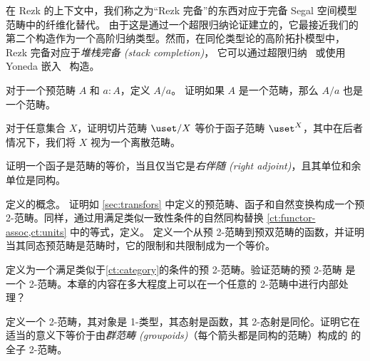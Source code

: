 在 Rezk 的上下文中，我们称之为“Rezk 完备”的东西对应于完备 Segal 空间模型范畴中的纤维化替代。
由于这是通过一个超限归纳论证建立的，它最接近我们的第二个构造作为一个高阶归纳类型。然而，在同伦类型论的高阶拓扑模型中，Rezk 完备对应于\emph{堆栈完备 (stack completion)}， 它可以通过超限归纳~\cite{jt:strong-stacks} 或使用 Yoneda 嵌入~\cite{bunge:stacks-morita-internal} 构造。


\sectionExercises

\begin{ex}\label{ex:slice-precategory}
对于一个预范畴 $A$ 和 $a:A$，定义 $A/a$。
%
%
证明如果 $A$ 是一个范畴，那么 $A/a$ 也是一个范畴。
%
\end{ex}

\begin{ex}\label{ex:set-slice-over-equiv-functor-category}
对于任意集合 $X$，证明切片范畴 $\uset/X$ 等价于函子范畴 $\uset^X$，其中在后者情况下，我们将 $X$ 视为一个离散范畴。
\end{ex}

\begin{ex}\label{ex:functor-equiv-right-adjoint}
%
%
证明一个函子是范畴的等价，当且仅当它是\emph{右伴随 (right adjoint)}，且其单位和余单位是同构。
\end{ex}

\begin{ex}\label{ct:pre2cat}
定义的概念。
%
证明如 \cref{sec:transfors} 中定义的预范畴、函子和自然变换构成一个预 2-范畴。同样，通过用满足类似一致性条件的自然同构替换 \cref{ct:functor-assoc,ct:units} 中的等式，定义。
定义一个从预 2-范畴到预双范畴的函数，并证明当其同态预范畴是范畴时，它的限制和共限制成为一个等价。
\end{ex}

\begin{ex}\label{ct:2cat}
定义为一个满足类似于\cref{ct:category}的条件的预 2-范畴。验证范畴的预 2-范畴 \ucat 是一个 2-范畴。本章的内容在多大程度上可以在一个任意的 2-范畴中进行内部处理？
\end{ex}

\begin{ex}\label{ct:groupoids}
定义一个 2-范畴，其对象是 1-类型，其态射是函数，其 2-态射是同伦。证明它在适当的意义下等价于由\emph{群范畴 (groupoids)}（每个箭头都是同构的范畴）构成的 \ucat 的全子 2-范畴。
\end{ex}

